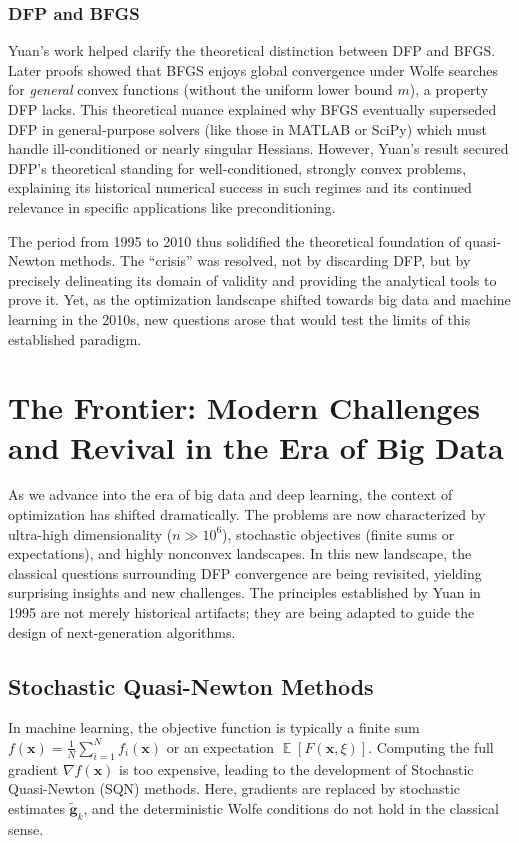 \documentclass[12pt,a4paper]{article}  %
\newcounter{cite}
\theoremstyle{definition}
\numberwithin{equation}{section}
\newcommand{\xx}{\mathbf{x}}
\renewcommand{\ggg}{\mathbf{g}}
\DeclareMathOperator{\expc}{\mathbb{E}}
\begin{document}
\subsubsection{DFP and BFGS}
Yuan's work \cite{yuan1995} helped clarify the theoretical distinction between DFP and BFGS. Later proofs showed that BFGS enjoys global convergence under Wolfe searches for \textit{general} convex functions (without the uniform lower bound $m$), a property DFP lacks. This theoretical nuance explained why BFGS eventually superseded DFP in general-purpose solvers (like those in MATLAB or SciPy) which must handle ill-conditioned or nearly singular Hessians. However, Yuan's result secured DFP's theoretical standing for well-conditioned, strongly convex problems, explaining its historical numerical success in such regimes and its continued relevance in specific applications like preconditioning.

The period from 1995 to 2010 thus solidified the theoretical foundation of quasi-Newton methods. The ``crisis'' was resolved, not by discarding DFP, but by precisely delineating its domain of validity and providing the analytical tools to prove it. Yet, as the optimization landscape shifted towards big data and machine learning in the 2010s, new questions arose that would test the limits of this established paradigm.

\section{The Frontier: Modern Challenges and Revival in the Era of Big Data}
\label{sec:frontier}

As we advance into the era of big data and deep learning, the context of optimization has shifted dramatically. The problems are now characterized by ultra-high dimensionality ($n \gg 10^6$), stochastic objectives (finite sums or expectations), and highly nonconvex landscapes. In this new landscape, the classical questions surrounding DFP convergence are being revisited, yielding surprising insights and new challenges. The principles established by Yuan in 1995 \cite{yuan1995} are not merely historical artifacts; they are being adapted to guide the design of next-generation algorithms.

\subsection{Stochastic Quasi-Newton Methods}
In machine learning, the objective function is typically a finite sum $f(\xx) = \frac{1}{N} \sum_{i=1}^N f_i(\xx)$ or an expectation $\expc[F(\xx, \xi)]$. Computing the full gradient $\nabla f(\xx)$ is too expensive, leading to the development of Stochastic Quasi-Newton (SQN) methods. Here, gradients are replaced by stochastic estimates $\tilde{\ggg}_k$, and the deterministic Wolfe conditions do not hold in the classical sense.
\end{document}
